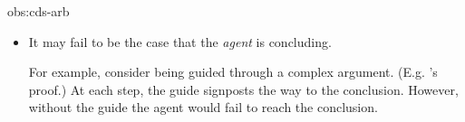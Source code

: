 \begin{note}
\begin{argument}{obs:cds-arb}
\begin{itemize}[leftmargin=*]
    For example, there are exactly five intermediate logics that have the interpolation property (\cite[cf.][]{Maksimova:1977un}).
    However, \citeauthor{Maksimova:1977un} may have been ready to give up on the proof at any point.%
    \footnote{%
      Admittedly, it is unlikely \citeauthor{Maksimova:1977un} would have given up, but the point stands.
    }
  \item
    It may fail to be the case that the \emph{agent} is concluding.

    For example, consider being guided through a complex argument.
    (E.g. \citeauthor{Maksimova:1977un}'s proof.)
    At each step, the guide signposts the way to the conclusion.
    However, without the guide the agent would fail to reach the conclusion.
  \end{itemize}
  \vspace{-\baselineskip}
  \end{argument}
\end{note}

\subsection{}
\label{sec:assupp2}

